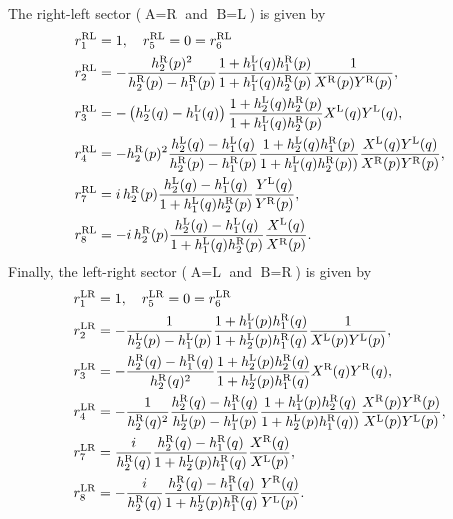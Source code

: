 \documentclass[12pt,a4paper]{article}
\numberwithin{equation}{section}
\newcommand{\tA}{\text{A}}
\newcommand{\tB}{\text{B}}
\newcommand{\tL}{\text{L}}
\newcommand{\tR}{\text{R}}
\begin{document}
The right-left sector ($ \tA=\tR $ and $ \tB=\tL $) is given by
%
 \begin{align}
 & r_1^{{\rm RL}}=1,\quad r_5^{{\rm RL}}=0=r_6^{{\rm RL}}\\
 & r_2^{{\rm RL}}=-\frac{h_2^{{\rm R}}(p)^2}{h_2^{{\rm R}}(p)-h_1^{{\rm R}}(p)}\frac{1+h_1^{{\rm L}}(q)h_1^{{\rm R}}(p)}{1+h_1^{{\rm L}}(q)h_2^{{\rm R}}(p)}\frac{1}{X^{{\rm R}}(p)Y^{{\rm R}}(p)},\\
 & r_3^{{\rm RL}}=-\left(h_2^{{\rm L}}(q)-h_1^{{\rm L}}(q)\right)\frac{1+h_2^{{\rm L}}(q)h_2^{{\rm R}}(p)}{1+h_1^{{\rm L}}(q)h_2^{{\rm R}}(p)}X^{{\rm L}}(q)Y^{{\rm L}}(q),\\
 & r_4^{{\rm RL}}=-h_2^{{\rm R}}(p)^2\frac{h_2^{{\rm L}}(q)-h_1^{{\rm L}}(q)}{h_2^{{\rm R}}(p)-h_1^{{\rm R}}(p)}\frac{1+h_2^{{\rm L}}(q)h_1^{{\rm R}}(p)}{1+h_1^{{\rm L}}(q)h_2^{{\rm R}}(p))}\frac{X^{{\rm L}}(q)Y^{{\rm L}}(q)}{X^{{\rm R}}(p)Y^{{\rm R}}(p)},\\
 & r_7^{{\rm RL}}=i\,h_2^{{\rm R}}(p)\frac{h_2^{{\rm L}}(q)-h_1^{{\rm L}}(q)}{1+h_1^{{\rm L}}(q)h_2^{{\rm R}}(p)}\frac{Y^{{\rm L}}(q)}{Y^{{\rm R}}(p)},\\ & r_8^{{\rm RL}}=-i\,h_2^{{\rm R}}(p)\frac{h_2^{{\rm L}}(q)-h_1^{{\rm L}}(q)}{1+h_1^{{\rm L}}(q)h_2^{{\rm R}}(p)}\frac{X^{{\rm L}}(q)}{X^{{\rm R}}(p)}.
 \end{align}
 Finally, the left-right sector ($\tA=\tL$ and $ \tB=\tR $) is given by
 \begin{align}
 & r_1^{{\rm LR}}=1,\quad r_5^{{\rm LR}}=0=r_6^{{\rm LR}}\\
 & r_2^{{\rm LR}}=-\frac{1}{h_2^{{\rm L}}(p)-h_1^{{\rm L}}(p)}\frac{1+h_1^{{\rm L}}(p)h_1^{{\rm R}}(q)}{1+h_2^{{\rm L}}(p)h_1^{{\rm R}}(q)}\frac{1}{X^{{\rm L}}(p)Y^{{\rm L}}(p)},\\
 & r_3^{{\rm LR}}=-\frac{h_2^{{\rm R}}(q)-h_1^{{\rm R}}(q)}{h_2^{{\rm R}}(q)^2}\frac{1+h_2^{{\rm L}}(p)h_2^{{\rm R}}(q)}{1+h_2^{{\rm L}}(p)h_1^{{\rm R}}(q)}X^{{\rm R}}(q)Y^{{\rm R}}(q),\\
 & r_4^{{\rm LR}}=-\frac{1}{h_2^{{\rm R}}(q)^2}\frac{h_2^{{\rm R}}(q)-h_1^{{\rm R}}(q)}{h_2^{{\rm L}}(p)-h_1^{{\rm L}}(p)}\frac{1+h_1^{{\rm L}}(p)h_2^{{\rm R}}(q)}{1+h_2^{{\rm L}}(p)h_1^{{\rm R}}(q))}\frac{X^{{\rm R}}(p)Y^{{\rm R}}(p)}{X^{{\rm L}}(p)Y^{{\rm L}}(p)},\\
 & r_7^{{\rm LR}}=\frac{i}{h_2^{{\rm R}}(q)}\frac{h_2^{{\rm R}}(q)-h_1^{{\rm R}}(q)}{1+h_2^{{\rm L}}(p)h_1^{{\rm R}}(q)}\frac{X^{{\rm R}}(q)}{X^{{\rm L}}(p)},\\ & r_8^{{\rm LR}}=-\frac{i}{h_2^{{\rm R}}(q)}\frac{h_2^{{\rm R}}(q)-h_1^{{\rm R}}(q)}{1+h_2^{{\rm L}}(p)h_1^{{\rm R}}(q)}\frac{Y^{{\rm R}}(q)}{Y^{{\rm L}}(p)}.
 \end{align}
\end{document}
